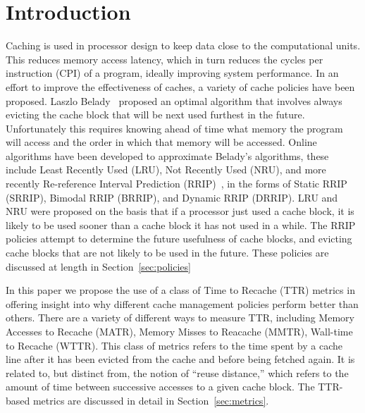 \section{Introduction}
Caching is used in processor design to keep data close to the computational units.
This reduces memory access latency, which in turn reduces the cycles per instruction (CPI) of a program, ideally improving system performance.
In an effort to improve the effectiveness of caches, a variety of cache policies have been proposed.
Laszlo Belady~\cite{belady66} proposed an optimal algorithm that involves always evicting the cache block that will be next used furthest in the future.
Unfortunately this requires knowing ahead of time what memory the program will access and the order in which that memory will be accessed.
Online algorithms have been developed to approximate Belady's algorithms,
	these include Least Recently Used (LRU), Not Recently Used (NRU),
	and more recently Re-reference Interval Prediction (RRIP)~\cite{jaleeltheobald10},
	in the forms of Static RRIP (SRRIP), Bimodal RRIP (BRRIP), and Dynamic RRIP (DRRIP).
LRU and NRU were proposed on the basis that if a processor just used a cache block,
	it is likely to be used sooner than a cache block it has not used in a while.
The RRIP policies attempt to determine the future usefulness of cache blocks,
	and evicting cache blocks that are not likely to be used in the future.
These policies are discussed at length in Section~\ref{sec:policies}

In this paper we propose the use of a class of Time to Recache (TTR) metrics in offering insight into why different cache management policies perform better than others.  
There are a variety of different ways to measure TTR, including Memory Accesses to Recache (MATR), Memory Misses to Reacache (MMTR), Wall-time to Recache (WTTR). 
This class of metrics refers to the time spent by a cache line after it has been evicted from the cache and before being fetched again.  
It is related to, but distinct from, the notion of ``reuse distance,'' which refers to the amount of time between successive accesses to a given cache block.
The TTR-based metrics are discussed in detail in Section~\ref{sec:metrics}.

